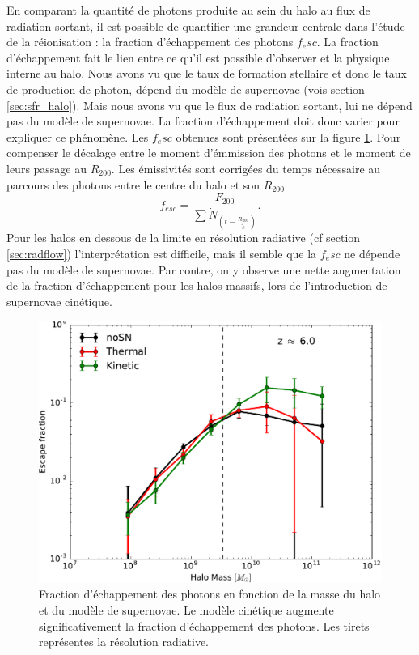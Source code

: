 En comparant la quantité de photons produite au sein du halo au flux de radiation sortant, il est possible de quantifier une grandeur centrale dans l'étude de la réionisation : la fraction d'échappement des photons $f_esc$.
La fraction d'échappement fait le lien entre ce qu'il est possible d'observer et la physique interne au halo.
Nous avons vu que le taux de formation stellaire et donc le taux de production de photon, dépend du modèle de supernovae (vois section \ref{sec:sfr_halo}).
Mais nous avons vu que le flux de radiation sortant, lui ne dépend pas du modèle de supernovae.
La fraction d'échappement doit donc varier pour expliquer ce phénomène.
Les $f_esc$ obtenues sont présentées sur la figure \ref{fig:fesc}.
Pour compenser le décalage entre le moment d'émmission des photons et le moment de leurs passage au $R_{200}$.
Les émissivités sont corrigées du temps nécessaire au parcours des photons entre le centre du halo et son $R_{200}$ \citep{kimm_feedback-regulated_2017}.
\begin{equation}
f_{esc} = \frac{ F_{200}} {\sum \dot{N}_{\left( t-\frac{R_{200}}{\tilde{c} } \right) } }.
\end{equation}
Pour les halos en dessous de la limite en résolution radiative (cf section \ref{sec:radflow}) l'interprétation est difficile, mais il semble que la $f_esc$ ne dépende pas du modèle de supernovae.
Par contre, on y observe une nette augmentation de la fraction d'échappement pour les halos massifs, lors de l'introduction de supernovae cinétique.




\begin{figure}
	\centering
	\includegraphics[width=.95\linewidth]{img/03/fesc.pdf} 
    \caption[Fraction d'échappement des photons]{Fraction d'échappement des photons en fonction de la masse du halo et du modèle de supernovae.
    Le modèle cinétique augmente significativement la fraction d'échappement des photons.
    Les tirets représentes la résolution radiative.
 	\label{fig:fesc}}
\end{figure}



